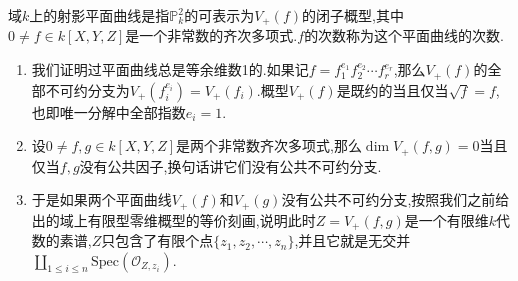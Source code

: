 域$k$上的射影平面曲线是指$\mathbb{P}_k^2$的可表示为$V_+(f)$的闭子概型,其中$0\not=f\in k[X,Y,Z]$是一个非常数的齐次多项式.$f$的次数称为这个平面曲线的次数.
\begin{enumerate}
	\item 我们证明过平面曲线总是等余维数1的.如果记$f=f_1^{e_1}f_2^{e_2}\cdots f_r^{e_r}$,那么$V_+(f)$的全部不可约分支为$V_+(f_i^{e_i})=V_+(f_i)$.概型$V_+(f)$是既约的当且仅当$\sqrt{f}=f$,也即唯一分解中全部指数$e_i=1$.
	\item 设$0\not=f,g\in k[X,Y,Z]$是两个非常数齐次多项式,那么$\dim V_+(f,g)=0$当且仅当$f,g$没有公共因子,换句话讲它们没有公共不可约分支.
	\item 于是如果两个平面曲线$V_+(f)$和$V_+(g)$没有公共不可约分支,按照我们之前给出的域上有限型零维概型的等价刻画,说明此时$Z=V_+(f,g)$是一个有限维$k$代数的素谱,$Z$只包含了有限个点$\{z_1,z_2,\cdots,z_n\}$,并且它就是无交并$\coprod_{1\le i\le n}\mathrm{Spec}(\mathscr{O}_{Z,z_i})$.
\end{enumerate}

